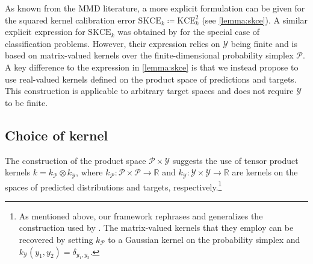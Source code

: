 \documentclass{article}
\begin{document}
As known from the MMD literature, a more explicit formulation can be given for
the squared kernel calibration error $\mathrm{SKCE}_k \coloneqq \mathrm{KCE}^2_k$ (see \cref{lemma:skce}).
A similar explicit expression for $\mathrm{SKCE}_k$ was obtained by \citet{Widmann2019} for
the special case of classification problems. However, their expression relies on 
$\mathcal{Y}$ being finite and is based on matrix-valued kernels over the
finite-dimensional probability simplex $\mathcal{P}$. A key difference to the
expression in \cref{lemma:skce} is that we instead propose to use real-valued kernels defined
on the product space of predictions and targets. This construction is applicable to
arbitrary target spaces and does not require $\mathcal{Y}$ to be finite.

\subsection{Choice of kernel}
\label{sec:kernel_choice}

The construction of the product space $\mathcal{P} \times \mathcal{Y}$ suggests
the use of tensor product kernels $k = k_{\mathcal{P}} \otimes k_{\mathcal{Y}}$, where
$k_{\mathcal{P}} \colon \mathcal{P} \times \mathcal{P} \to \mathbb{R}$ and
$k_{\mathcal{Y}} \colon \mathcal{Y} \times \mathcal{Y} \to \mathbb{R}$ are
kernels on the spaces of predicted distributions and targets, respectively.\footnote{As
mentioned above, our framework rephrases and generalizes the construction used
by \citet{Widmann2019}. The matrix-valued kernels that they employ can be
recovered by setting $k_{\mathcal{P}}$ to a Gaussian kernel on the probability simplex and
$k_{\mathcal{Y}}(y_1, y_2) = \delta_{y_1,y_2}$.}
\end{document}
